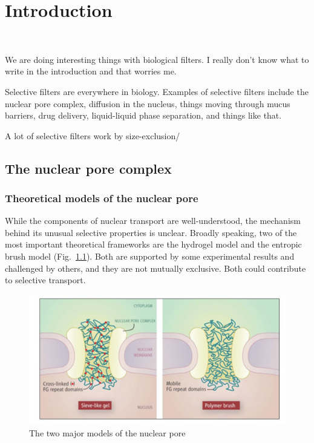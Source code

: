 \chapter{Introduction}~\label{ch01_introduction}

We are doing interesting things with biological filters.  I really don't know what to write in the introduction and that worries me.

Selective filters are everywhere in biology.  Examples of selective filters include the nuclear pore complex, diffusion in the nucleus, things moving through mucus barriers, drug delivery, liquid-liquid phase separation, and things like that.

A lot of selective filters work by size-exclusion/

\section{The nuclear pore complex}

\subsection{Theoretical models of the nuclear pore}

While the components of nuclear transport are well-understood, the mechanism behind its unusual selective properties is unclear.  Broadly speaking, two of the most important theoretical frameworks are the hydrogel model and the entropic brush model (Fig.~\ref{fig:hydrogel-entropic-brush}).  Both are supported by some experimental results and challenged by others, and they are not mutually exclusive.  Both could contribute to selective transport.

\begin{figure}
\centering
\includegraphics[width=0.7\linewidth]{figs/ch01/elbaum}
\caption[Two important models of nuclear transport.]{The two major models of the nuclear pore \cite{elbaum06}}
\label{fig:hydrogel-entropic-brush}
\end{figure}

